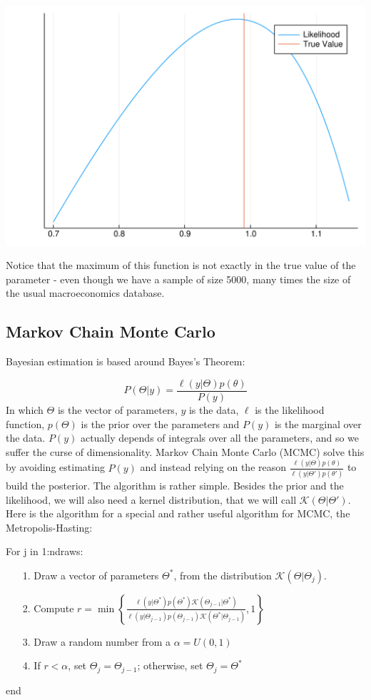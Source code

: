 \documentclass[12pt,a4paper]{article}
\begin{document}
\includegraphics[width=\linewidth]{figures/dsge_and_julia_17_1.pdf}

Notice that the maximum of this function is not exactly in the true value of the parameter - even though we have a sample of size 5000, many times the size of the usual macroeconomics database.

\subsection{Markov Chain Monte Carlo}
Bayesian estimation is based around Bayes's Theorem:

\[
P(\Theta|y) = \frac{\ell(y|\Theta)p(\theta)}{P(y)}
\]
In which $\Theta$ is the vector of parameters, $y$ is the data, $\ell$ is the likelihood function, $p(\Theta)$ is the prior over the parameters and $P(y)$ is the marginal over the data. $P(y)$ actually depends of integrals over all the parameters, and so we suffer the curse of dimensionality. Markov Chain Monte Carlo (MCMC) solve this by avoiding estimating $P(y)$ and instead relying on the reason $\frac{\ell(y|\Theta)p(\theta)}{\ell(y|\Theta')p(\theta')}$ to build the posterior. The algorithm is rather simple. Besides the prior and the likelihood, we will also need a kernel distribution, that we will call $\mathcal{K}(\Theta|\Theta')$. Here is the algorithm for a special and rather useful algorithm for MCMC, the Metropolis-Hasting:

For j in 1:ndraws:

\begin{itemize}
\item[1. ] Draw a vector of parameters $\Theta^{*}$, from the distribution $\mathcal{K}(\Theta|\Theta_j)$.


\item[2. ] Compute $r = \min\left\{\frac{\ell(y|\Theta^*)p(\Theta^*)\mathcal{K}(\Theta_{j-1}|\Theta^*)}{\ell(y|\Theta_{j-1})p(\Theta_{j-1})\mathcal{K}(\Theta^*|\Theta_{j-1})},1\right\}$


\item[3. ] Draw a random number from a $\alpha = U(0,1)$


\item[4. ] If $r < \alpha$, set $\Theta_j = \Theta_{j-1}$; otherwise, set $\Theta_j = \Theta^{*}$

\end{itemize}
end
\end{document}
